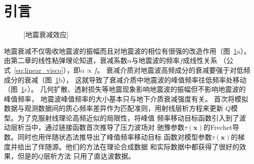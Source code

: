 \section{引言}
\begin{figure}[!htbp]
    \centering
    [地震衰减效应]
    \label{fig:q_effect}
\end{figure}
地震衰减不仅吸收地震波的振幅而且对地震波的相位有很强的改造作用（图~\ref{fig:q_effect}a）。
由第二章的线性粘弹理论知道，衰减系数$\alpha$与地震波的频率$f$成线性关系
（公式~\ref{eq:linear_visco}），即$\alpha\propto f$。
衰减介质对地震波高频成分的衰减要强于对低频成分的衰减（图~\ref{fig:q_effect}b），
这就导致了衰减介质中地震波的峰值频率往低频率处移动（图~\ref{fig:q_effect}c）。
几何扩散、透射损失等地震现象影响地震波的振幅但不影响地震波的峰值频率，
地震波峰值频率的大小基本只与地下介质衰减强度有关。
首次将模拟数据与观测数据间的质心频率差异作为匹配准则，用射线层析方程来更新
$Q$模型。为了克服射线理论高频近似的局限性，将峰值
频率移动目标函数引入到了波动层析当中，通过链接函数首次推导了压力波场对
驰豫参数$\tau(\mathbf{x})$的Frechet导数。同时也用伴随状态法推导出了峰值频率移动目标
函数对模型参数$\tau(\mathbf{x})$的梯度并给出了伴随源。他们的方法在理论合成数据
和实际数据中都获得了很好的效果，但是的$Q$层析方法
只用了直达波数据。

